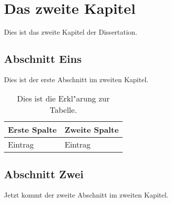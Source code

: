 \chapter{Das zweite Kapitel}

Dies ist das zweite Kapitel der Dissertation.


\section{Abschnitt Eins}

Dies ist der erste Abschnitt im zweiten Kapitel.



\begin{table}[htb]
\centering
\begin{tabular}{l|l}
Erste Spalte & Zweite Spalte \\ \hline
Eintrag & Eintrag
\end{tabular}
 \caption[Kurzform f"ur das Tabellenverzeichnis]{Dies ist die Erkl"arung zur Tabelle.}
\end{table}


\section{Abschnitt Zwei}

Jetzt kommt der zweite Abschnitt im zweiten Kapitel.
